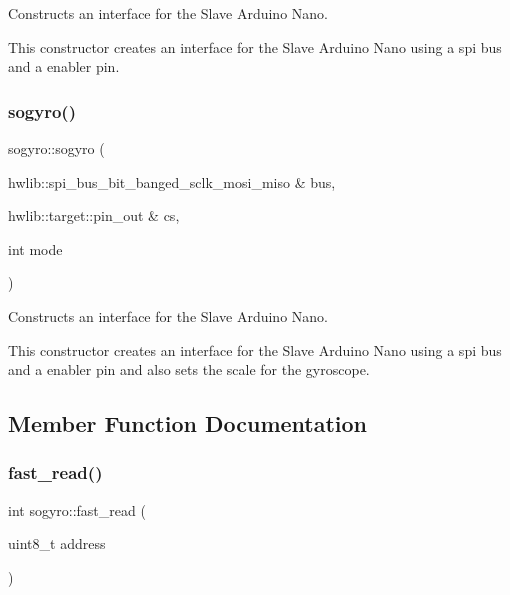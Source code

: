 Constructs an interface for the Slave Arduino Nano. 

This constructor creates an interface for the Slave Arduino Nano using a spi bus and a enabler pin. \mbox{\label{classsogyro_a43e6a4ab150faccd436e63c9f41c885d}} 
\subsubsection{\texorpdfstring{sogyro()}{sogyro()}\hspace{0.1cm}{\footnotesize\ttfamily [2/2]}}
{\footnotesize\ttfamily sogyro\+::sogyro (\begin{DoxyParamCaption}\item[{hwlib\+::spi\+\_\+bus\+\_\+bit\+\_\+banged\+\_\+sclk\+\_\+mosi\+\_\+miso \&}]{bus,  }\item[{hwlib\+::target\+::pin\+\_\+out \&}]{cs,  }\item[{int}]{mode }\end{DoxyParamCaption})\hspace{0.3cm}{\ttfamily [inline]}}



Constructs an interface for the Slave Arduino Nano. 

This constructor creates an interface for the Slave Arduino Nano using a spi bus and a enabler pin and also sets the scale for the gyroscope. 

\subsection{Member Function Documentation}
\mbox{\label{classsogyro_ae8d4d35c21a057146898ee56ccbfca70}} 
\subsubsection{\texorpdfstring{fast\+\_\+read()}{fast\_read()}\hspace{0.1cm}{\footnotesize\ttfamily [1/2]}}
{\footnotesize\ttfamily int sogyro\+::fast\+\_\+read (\begin{DoxyParamCaption}\item[{uint8\+\_\+t}]{address }\end{DoxyParamCaption})\hspace{0.3cm}{\ttfamily [inline]}}



